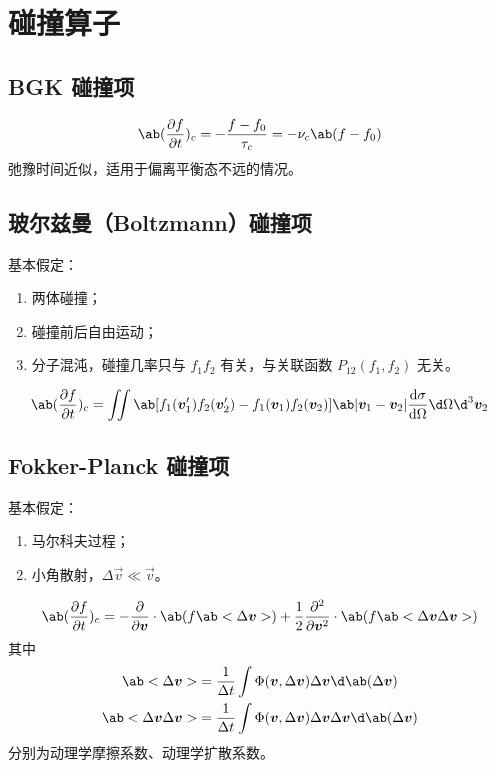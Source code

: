 
\chapter{碰撞算子}

\section{BGK 碰撞项}

\begin{equation}
\ab(\pdv{f}{t})_c = - \frac{f - f_0}{\tau_c} = - \nu_c \ab(f - f_0)
\end{equation}
弛豫时间近似，适用于偏离平衡态不远的情况。

\section{玻尔兹曼（Boltzmann）碰撞项}

基本假定：
\begin{enumerate}
    \item 两体碰撞；
    \item 碰撞前后自由运动；
    \item 分子混沌，碰撞几率只与 $f_1 f_2$ 有关，与关联函数 $P_{12}(f_1,f_2)$ 无关。
\end{enumerate}

\begin{equation}
\ab(\pdv{f}{t})_c = \iint \ab[
    f_1(\vec{v}_1') f_2(\vec{v}_2')
    - f_1(\vec{v}_1) f_2(\vec{v}_2)
] \ab|\vec{v}_1 - \vec{v}_2| \odv{\sigma}{\Omega}
\d\Omega \d^3\vec{v}_2
\end{equation}

\section{Fokker-Planck 碰撞项}

基本假定：
\begin{enumerate}
    \item 马尔科夫过程；
    \item 小角散射，$\Delta\vec{v}\ll\vec{v}$。
\end{enumerate}

\begin{equation}
\ab(\pdv{f}{t})_c =
- \pdv{}{\vec{v}} \cdot \ab(f \ab<\Delta\vec{v}>)
+ \frac{1}{2} \pdv[2]{}{\vec{v}} \cdot
\ab(f \ab<\Delta\vec{v} \Delta\vec{v}>)
\end{equation}
其中
\begin{subequations}\begin{align}
\ab<\Delta\vec{v}> &= \frac{1}{\Delta t}
\int \Phi(\vec{v}, \Delta\vec{v})
\Delta\vec{v} \d\ab(\Delta\vec{v}) \\
\ab<\Delta\vec{v}\Delta\vec{v}> &= \frac{1}{\Delta t}
\int \Phi(\vec{v}, \Delta\vec{v})
\Delta\vec{v}\Delta\vec{v} \d\ab(\Delta\vec{v})
\end{align}\end{subequations}
分别为动理学摩擦系数、动理学扩散系数。

